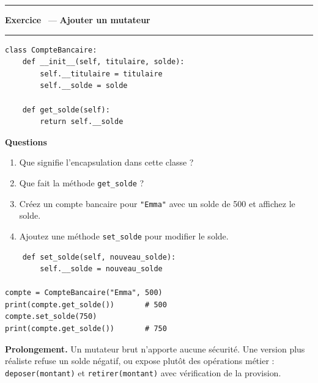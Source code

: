 \documentclass[10pt,a4paper]{article}
\newif\ifcorrige
\newcommand{\py}[1]{\texttt{#1}}
\newcounter{exo}
\newcommand{\exo}[1]{%
  \stepcounter{exo}\par\vspace{4pt}
  \ifcorrige\else\noindent\minipage{\textwidth}\fi
  \noindent\textcolor{qbar}{\rule{2.5pt}{10pt}}\hspace{4pt}%
  \textbf{\color{qbar}Exercice \theexo}\ --- \textbf{#1}%
  \par\nobreak\vspace{-3pt}\noindent\textcolor{qbar!35}{\rule{\textwidth}{0.6pt}}%
  \par\nobreak\vspace{1pt}}
\newenvironment{codebloc}
  {\ifcorrige\else\noindent\minipage[t]{0.50\textwidth}\vspace{0pt}\fi}
  {\ifcorrige\else\endminipage\hfill\fi}
\newenvironment{qbloc}
  {\ifcorrige\else\minipage[t]{0.475\textwidth}\vspace{0pt}\fi
   \textbf{\small Questions}\begin{enumerate}[leftmargin=*,nosep,label=\arabic*.]}
  {\end{enumerate}\ifcorrige\else\endminipage\par\fi}
\newcommand{\rep}[1]{\ifcorrige\par\smallskip{\color{corr}\small#1}\par\smallskip\fi}
\newlength{\zoneadj}\setlength{\zoneadj}{0pt}
\newcommand{\zone}[1][4cm]{%
  \ifcorrige\else
    \par\vspace{2pt}\noindent
    \begin{tcolorbox}[colback=white,colframe=black!45,boxrule=0.5pt,arc=1pt,height={\dimexpr#1-\zoneadj\relax},
      left=4pt,right=4pt,top=2pt,bottom=2pt,
      title={\scriptsize\itshape Réponses},coltitle=black!55,fonttitle=\itshape,
      detach title,before upper={\tcbtitle\par}]\end{tcolorbox}%
    \endminipage\par
  \fi}
\newenvironment{solution}
  {\ifcorrige
     \begin{tcolorbox}[enhanced,breakable,colback=corrbg,colframe=corr,boxrule=0.6pt,arc=1pt,
       left=5pt,right=5pt,top=3pt,bottom=3pt,fontupper=\small,
       title={Corrigé},coltitle=corr,fonttitle=\bfseries\small,detach title,
       before upper={\tcbtitle\par\smallskip}]%
   \else
     \setbox0\vbox\bgroup
   \fi}
  {\ifcorrige\end{tcolorbox}\else\egroup\fi}
\begin{document}
\exo{Ajouter un mutateur}
\begin{codebloc}
\begin{lstlisting}
class CompteBancaire:
    def __init__(self, titulaire, solde):
        self.__titulaire = titulaire
        self.__solde = solde

    def get_solde(self):
        return self.__solde
\end{lstlisting}
\end{codebloc}
\begin{qbloc}
  \item Que signifie l'encapsulation dans cette classe ?
    \rep{Le titulaire et le solde sont privés : aucun code extérieur ne peut écrire
    \py{compte.__solde = 1000000}. Le solde ne peut être consulté que par \py{get_solde} et modifié
    que par les méthodes que la classe met à disposition.}
  \item Que fait la méthode \py{get_solde} ?
    \rep{Elle retourne la valeur de l'attribut privé \py{__solde} : c'est un accesseur en lecture
    seule.}
  \item Créez un compte bancaire pour \py{"Emma"} avec un solde de 500 et affichez le solde.
  \item Ajoutez une méthode \py{set_solde} pour modifier le solde.
\end{qbloc}
\zone[4.0cm]
\begin{solution}
\begin{lstlisting}
    def set_solde(self, nouveau_solde):
        self.__solde = nouveau_solde

compte = CompteBancaire("Emma", 500)
print(compte.get_solde())       # 500
compte.set_solde(750)
print(compte.get_solde())       # 750
\end{lstlisting}
\textbf{Prolongement.} Un mutateur brut n'apporte aucune sécurité. Une version plus réaliste refuse
un solde négatif, ou expose plutôt des opérations métier : \py{deposer(montant)} et
\py{retirer(montant)} avec vérification de la provision.
\end{solution}
\end{document}
